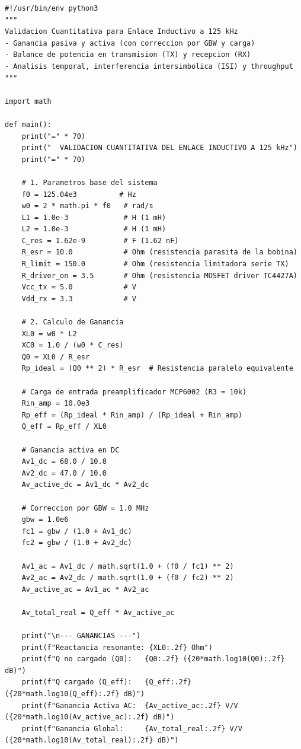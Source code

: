 \begin{lstlisting}[style=custompy, caption={Cálculo analítico de parámetros de ganancia, potencia e ISI (\texttt{informe\_ieee/datos/calcular\_parametros\_enlace.py})}]
#!/usr/bin/env python3
"""
Validacion Cuantitativa para Enlace Inductivo a 125 kHz
- Ganancia pasiva y activa (con correccion por GBW y carga)
- Balance de potencia en transmision (TX) y recepcion (RX)
- Analisis temporal, interferencia intersimbolica (ISI) y throughput
"""

import math

def main():
    print("=" * 70)
    print("  VALIDACION CUANTITATIVA DEL ENLACE INDUCTIVO A 125 kHz")
    print("=" * 70)

    # 1. Parametros base del sistema
    f0 = 125.04e3          # Hz
    w0 = 2 * math.pi * f0   # rad/s
    L1 = 1.0e-3             # H (1 mH)
    L2 = 1.0e-3             # H (1 mH)
    C_res = 1.62e-9         # F (1.62 nF)
    R_esr = 10.0            # Ohm (resistencia parasita de la bobina)
    R_limit = 150.0         # Ohm (resistencia limitadora serie TX)
    R_driver_on = 3.5       # Ohm (resistencia MOSFET driver TC4427A)
    Vcc_tx = 5.0            # V
    Vdd_rx = 3.3            # V
    
    # 2. Calculo de Ganancia
    XL0 = w0 * L2
    XC0 = 1.0 / (w0 * C_res)
    Q0 = XL0 / R_esr
    Rp_ideal = (Q0 ** 2) * R_esr  # Resistencia paralelo equivalente
    
    # Carga de entrada preamplificador MCP6002 (R3 = 10k)
    Rin_amp = 10.0e3
    Rp_eff = (Rp_ideal * Rin_amp) / (Rp_ideal + Rin_amp)
    Q_eff = Rp_eff / XL0
    
    # Ganancia activa en DC
    Av1_dc = 68.0 / 10.0
    Av2_dc = 47.0 / 10.0
    Av_active_dc = Av1_dc * Av2_dc
    
    # Correccion por GBW = 1.0 MHz
    gbw = 1.0e6
    fc1 = gbw / (1.0 + Av1_dc)
    fc2 = gbw / (1.0 + Av2_dc)
    
    Av1_ac = Av1_dc / math.sqrt(1.0 + (f0 / fc1) ** 2)
    Av2_ac = Av2_dc / math.sqrt(1.0 + (f0 / fc2) ** 2)
    Av_active_ac = Av1_ac * Av2_ac
    
    Av_total_real = Q_eff * Av_active_ac

    print("\n--- GANANCIAS ---")
    print(f"Reactancia resonante: {XL0:.2f} Ohm")
    print(f"Q no cargado (Q0):   {Q0:.2f} ({20*math.log10(Q0):.2f} dB)")
    print(f"Q cargado (Q_eff):   {Q_eff:.2f} ({20*math.log10(Q_eff):.2f} dB)")
    print(f"Ganancia Activa AC:  {Av_active_ac:.2f} V/V ({20*math.log10(Av_active_ac):.2f} dB)")
    print(f"Ganancia Global:     {Av_total_real:.2f} V/V ({20*math.log10(Av_total_real):.2f} dB)")


\end{lstlisting}
